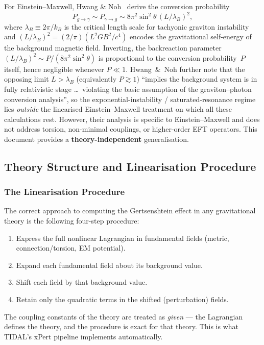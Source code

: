 For Einstein--Maxwell, Hwang \& Noh~\cite{hwangnoh2023graviton} derive the
conversion probability
\begin{equation}
  P_{g\to\gamma}\sim P_{\gamma\to g}\sim 8\pi^{2}\sin^{2}\!\theta\,(L/\lambda_{B})^{2},
  \label{eq:bv-hn-P}
\end{equation}
where $\lambda_{B}\equiv 2\pi/k_{B}$ is the critical length scale for
tachyonic graviton instability and $(L/\lambda_{B})^{2}=(2/\pi)(L^{2}GB^{2}/c^{4})$
encodes the gravitational self-energy of the background magnetic field.
Inverting, the backreaction parameter
$(L/\lambda_{B})^{2}\sim P/(8\pi^{2}\sin^{2}\!\theta)$ is proportional to
the conversion probability~$P$ itself, hence negligible whenever
$P\ll 1$.  Hwang~\&~Noh further note that the opposing limit
$L > \lambda_{B}$ (equivalently $P\gtrsim 1$) ``implies the background
system is in fully relativistic stage \ldots\ violating the basic
assumption of the graviton--photon conversion analysis'', so the
exponential-instability / saturated-resonance regime lies \emph{outside}
the linearised Einstein--Maxwell treatment on which all these
calculations rest.  However, their analysis is specific to
Einstein--Maxwell and does not address torsion, non-minimal couplings,
or higher-order EFT operators.  This document provides a
\textbf{theory-independent} generalisation.


\subsection{Theory Structure and Linearisation Procedure}
\label{sec:bv-theory}

\subsubsection{The Linearisation Procedure}
\label{sec:bv-procedure}

The correct approach to computing the Gertsenshtein effect in any
gravitational theory is the following four-step procedure:
\begin{enumerate}
  \item Express the full nonlinear Lagrangian in fundamental fields
    (metric, connection/torsion, EM potential).
  \item Expand each fundamental field about its background value.
  \item Shift each field by that background value.
  \item Retain only the quadratic terms in the shifted (perturbation) fields.
\end{enumerate}
The coupling constants of the theory are treated as \emph{given} --- the
Lagrangian defines the theory, and the procedure is exact for that theory.
This is what TIDAL's xPert pipeline implements automatically.

